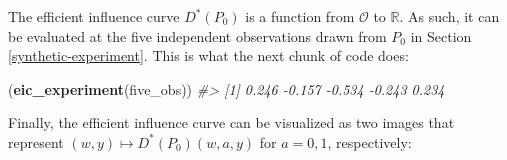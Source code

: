 \documentclass[11pt,openright,twoside]{book}
\newenvironment{Shaded}{\begin{snugshade}}{\end{snugshade}}
\newcommand{\CommentTok}[1]{\textcolor[rgb]{0.56,0.35,0.01}{\textit{#1}}}
\newcommand{\DataTypeTok}[1]{\textcolor[rgb]{0.13,0.29,0.53}{#1}}
\newcommand{\DecValTok}[1]{\textcolor[rgb]{0.00,0.00,0.81}{#1}}
\newcommand{\FloatTok}[1]{\textcolor[rgb]{0.00,0.00,0.81}{#1}}
\newcommand{\KeywordTok}[1]{\textcolor[rgb]{0.13,0.29,0.53}{\textbf{#1}}}
\newcommand{\NormalTok}[1]{#1}
\newcommand{\OperatorTok}[1]{\textcolor[rgb]{0.81,0.36,0.00}{\textbf{#1}}}
\newcommand{\OtherTok}[1]{\textcolor[rgb]{0.56,0.35,0.01}{#1}}
\newcommand{\StringTok}[1]{\textcolor[rgb]{0.31,0.60,0.02}{#1}}
\newcommand{\bbR}{\mathbb{R}}
\newcommand{\calO}{\mathcal{O}}
\theoremstyle{definition}
\theoremstyle{definition}
\theoremstyle{definition}
\theoremstyle{remark}
\begin{document}
The efficient influence curve \(D^{*}(P_{0})\) is a function from \(\calO\) to
\(\bbR\). As such, it can be evaluated at the five independent observations
drawn from \(P_{0}\) in Section \ref{synthetic-experiment}. This is what the
next chunk of code does:

\begin{Shaded}
\begin{Highlighting}[]
\NormalTok{(}\KeywordTok{eic_experiment}\NormalTok{(five_obs))}
\CommentTok{#> [1]  0.246 -0.157 -0.534 -0.243  0.234}
\end{Highlighting}
\end{Shaded}

Finally, the efficient influence curve can be visualized as two images that
represent \((w,y) \mapsto D^{*}(P_{0})(w,a,y)\) for \(a = 0,1\), respectively:



\begin{Shaded}
\end{Shaded}
\end{document}
